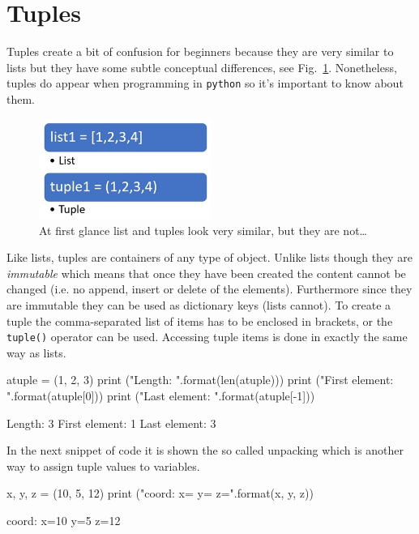\section{Tuples}\label{tuples}

Tuples create a bit of confusion for beginners because they are very similar to lists 
but they have some subtle conceptual differences, see Fig.~\ref{fig:tuples}.
Nonetheless, tuples do appear when programming in \texttt{python} so it's important to know about them.

\begin{figure}[hb]
\centering
\includegraphics[width=0.5\textwidth]{figures/Difference-Between-List-and-Tuple-fig-1-2.jpg}
\caption{At first glance list and tuples look very similar, but they are not\ldots}
\label{fig:tuples}
\end{figure}

Like lists, tuples are containers of any type of object. Unlike lists though they are \emph{immutable} which means that once they have been created the content cannot be changed (i.e. no append, insert or delete of the elements). Furthermore since they are immutable they can be used as dictionary keys (lists cannot). To create a tuple the comma-separated list of items has to be enclosed in brackets, or the \texttt{tuple()} operator can be used. Accessing tuple items is done in exactly the same way as lists.

\begin{ipython}
atuple = (1, 2, 3)
print ("Length: {}".format(len(atuple)))
print ("First element: {}".format(atuple[0]))
print ("Last element: {}".format(atuple[-1]))
\end{ipython}
\begin{ioutput}
Length: 3
First element: 1
Last element: 3
\end{ioutput}

In the next snippet of code it is shown the so called unpacking which is another way to assign tuple values to variables.

\begin{ipython}
x, y, z = (10, 5, 12)
print ("coord: x={} y={} z={}".format(x, y, z))
\end{ipython}
\begin{ioutput}
coord: x=10 y=5 z=12
\end{ioutput}

